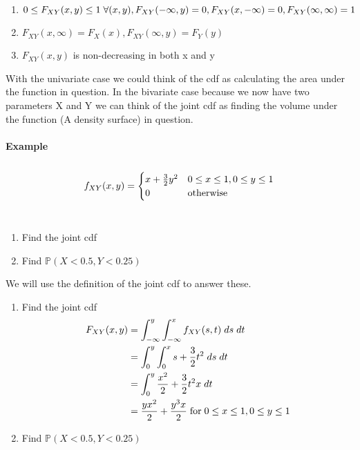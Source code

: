 \documentclass[,oneside]{article}
\begin{document}
\begin{enumerate}
\begin{enumerate}
\item $ 0 \leq F_{XY}(x,y) \leq 1\hspace{0.1cm} \forall (x, y), F_{XY}(-\infty,y)=0,\\ F_{XY}(x,-\infty)=0, F_{XY}(\infty,\infty)=1$
\item $F_{XY}(x,\infty)=F_X(x), F_{XY}(\infty, y)=F_Y(y)$
\item $F_{XY}(x,y)$ is non-decreasing in both x and y
\end{enumerate}
With the univariate case we could think of the cdf as calculating the area under the function in question. In the bivariate case because we now have two parameters X and Y we can think of the joint cdf as finding the volume under the function (A density surface) in question.\\ \\
\textbf{Example}\\ \\
\[
f_{XY}(x,y)=
\begin{cases}
x+\frac{3}{2}y^2 &  0 \leq x \leq 1, 0 \leq y \leq 1\\
0 & $otherwise$
\end{cases} \] \\
\begin{enumerate}
\item Find the joint cdf
\item Find $\mathbb{P}(X < 0.5, Y < 0.25)$
\end{enumerate}
We will use the definition of the joint cdf to answer these.
\begin{enumerate}
\item Find the joint cdf
\begin{align*}
F_{XY}(x,y)&=\int_{-\infty}^{y}\int_{-\infty}^{x} f_{XY}(s, t)\hspace{0.1cm}ds\hspace{0.1cm}dt\\
&=\int_{0}^{y}\int_{0}^{x} s+\frac{3}{2}t^2\hspace{0.1cm}ds\hspace{0.1cm}dt\\
&=\int_{0}^{y} \frac{x^2}{2}+\frac{3}{2}t^2 x\hspace{0.1cm}dt\\
&= \frac{yx^2}{2}+\frac{y^3 x}{2}  \hspace{0.1cm}\text{for}\hspace{0.1cm} 0 \leq x \leq 1, 0 \leq y \leq 1
\end{align*}
\item Find $\mathbb{P}(X < 0.5, Y < 0.25)$

\end{enumerate}
\end{enumerate}
\end{document}
